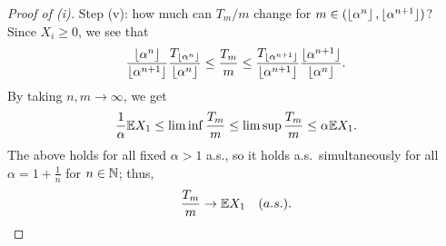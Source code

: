 \begin{proof}[Proof of (i)]
    Step (v): how much can $T_m/m$ change for $m \in (\left\lfloor \alpha^n \right\rfloor, \lfloor{\alpha^{n+1}}\rfloor)$? Since $X_i \geq 0$, we see that
    \[ \frac{\lfloor \alpha^{n} \rfloor}{\lfloor \alpha^{n+1} \rfloor} \frac{T_{\left\lfloor \alpha^n \right\rfloor}}{\lfloor \alpha^{n} \rfloor} \leq \frac{T_m}{m} \leq \frac{T_{\lfloor \alpha^{n+1} \rfloor}}{\lfloor \alpha^{n+1} \rfloor} \frac{\lfloor \alpha^{n+1} \rfloor}{\lfloor \alpha^{n} \rfloor}. \]
    By taking $n, m \to \infty$, we get
    \[ \frac{1}{\alpha} \mathbb E X_1 \leq \liminf \frac{T_m}{m} \leq \limsup \frac{T_m}{m} \leq \alpha \mathbb E X_1. \]
    The above holds for all fixed $\alpha > 1$ a.s., so it holds a.s.\ simultaneously for all $\alpha = 1 + \frac{1}{n}$ for $n \in \mathbb N$; thus,
    \[ \frac{T_m}{m} \to \mathbb E X_1 \quad (a.s.). \qedhere \]
\end{proof}
